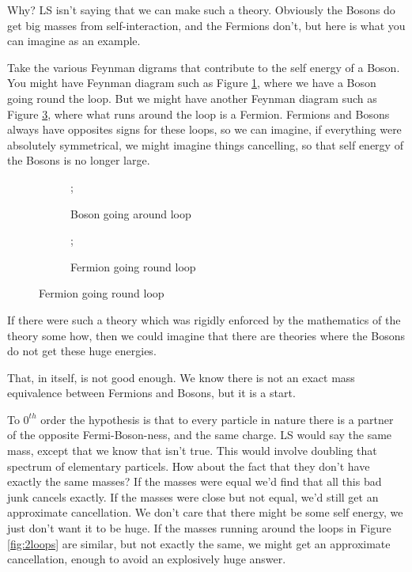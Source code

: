 \documentclass[]{article}
\begin{document}
Why? LS isn't saying that we can make such a theory. Obviously the Bosons do get big masses from self-interaction, and the Fermions don't, but here is what you can imagine as an example.    

Take the various Feynman digrams that contribute to the self energy of a Boson. You might have Feynman diagram such as  Figure \ref{fig:2loops:bosons}, where we have a Boson going round the loop. But we might have another Feynman diagram such as Figure \ref{fig:2loops:fermions}, where what runs around the loop is a Fermion. Fermions and Bosons always have opposites signs for these loops, so we can imagine, if everything were absolutely symmetrical, we might imagine things cancelling, so that self energy of the Bosons is no longer large.

\begin{figure}[H]
	\caption{Some illustrative Feynman Diagrams for a Boson}\label{fig:2loops}
	\begin{subfigure}{0.45\textwidth}
		\caption{Boson going around loop}\label{fig:2loops:bosons}
		;
	\end{subfigure}
	\begin{subfigure}{0.45\textwidth}
		\caption{Fermion going round loop}\label{fig:2loops:fermions}
		;
	\end{subfigure}
\end{figure}

If there were such a theory which was rigidly enforced by the mathematics of the theory some how, then we could imagine that there are theories where the Bosons do not get these huge energies.

That, in itself, is not good enough. We know there is not an exact mass equivalence between  Fermions and Bosons, but it is a start.

To $0^{th}$ order the hypothesis is that to every particle in nature there is a partner of the opposite Fermi-Boson-ness, and the same charge. LS would say the same mass, except that we know that isn't true. This would involve doubling that spectrum of elementary particels. How about the fact that they don't have exactly the same masses? If the masses were equal we'd find that all this bad junk cancels exactly. If the masses were close but not equal, we'd still get an approximate cancellation. We don't care that there might be some self energy, we just don't want it to be huge. If the masses running around the loops in Figure \ref{fig:2loops} are similar, but not exactly the same, we might get an approximate cancellation, enough to avoid an explosively huge answer.
\end{document}
